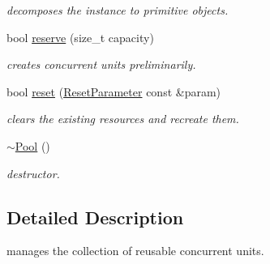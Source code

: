 \begin{DoxyCompactItemize}
\begin{DoxyCompactList}\small\item\em decomposes the instance to primitive objects. \end{DoxyCompactList}\item 
\hypertarget{classhryky_1_1thread_1_1_pool_ae98cafaf20f22576e93b03b4892f55f4}{bool \hyperlink{classhryky_1_1thread_1_1_pool_ae98cafaf20f22576e93b03b4892f55f4}{reserve} (size\-\_\-t capacity)}\label{classhryky_1_1thread_1_1_pool_ae98cafaf20f22576e93b03b4892f55f4}

\begin{DoxyCompactList}\small\item\em creates concurrent units preliminarily. \end{DoxyCompactList}\item 
\hypertarget{classhryky_1_1thread_1_1_pool_a7060b7e3c556334ec71aa2b42401231f}{bool \hyperlink{classhryky_1_1thread_1_1_pool_a7060b7e3c556334ec71aa2b42401231f}{reset} (\hyperlink{structhryky_1_1thread_1_1_pool_1_1_reset_parameter}{Reset\-Parameter} const \&param)}\label{classhryky_1_1thread_1_1_pool_a7060b7e3c556334ec71aa2b42401231f}

\begin{DoxyCompactList}\small\item\em clears the existing resources and recreate them. \end{DoxyCompactList}\item 
\hypertarget{classhryky_1_1thread_1_1_pool_a2b2641eafd17e11334554b85d0a41002}{\hyperlink{classhryky_1_1thread_1_1_pool_a2b2641eafd17e11334554b85d0a41002}{$\sim$\-Pool} ()}\label{classhryky_1_1thread_1_1_pool_a2b2641eafd17e11334554b85d0a41002}

\begin{DoxyCompactList}\small\item\em destructor. \end{DoxyCompactList}\end{DoxyCompactItemize}


\subsection{Detailed Description}
manages the collection of reusable concurrent units. 

